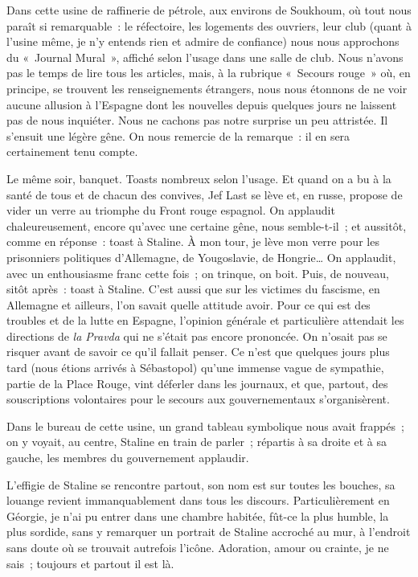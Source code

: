 \documentclass[twoside]{book} %
\newcommand{\astermono}{\medskip\centerline{\color{rubric}\large\selectfont{\syms ✻}}\medskip\par}%
\newcommand\chaptercont{} %
\begin{document}
\chaptercont
\noindent Dans cette usine de raffinerie de pétrole, aux environs de Soukhoum, où tout nous paraît si remarquable : le réfectoire, les logements des ouvriers, leur club (quant à l’usine même, je n’y entends rien et admire de confiance) nous nous approchons du « Journal Mural », affiché selon l’usage dans une salle de club. Nous n’avons pas le temps de lire tous les articles, mais, à la rubrique « Secours rouge » où, en principe, se trouvent les renseignements étrangers, nous nous étonnons de ne voir aucune allusion à l’Espagne dont les nouvelles depuis quelques jours ne laissent pas de nous inquiéter. Nous ne cachons pas notre surprise un peu attristée. Il s’ensuit une légère gêne. On nous remercie de la remarque : il en sera certainement tenu compte.\par
Le même soir, banquet. Toasts nombreux selon l’usage. Et quand on a bu à la santé de tous et de chacun des convives, Jef Last se lève et, en russe, propose de vider un verre au triomphe du Front rouge espagnol. On applaudit chaleureusement, encore qu’avec une certaine gêne, nous semble-t-il ; et aussitôt, comme en réponse : toast à Staline. À mon tour, je lève mon verre pour les prisonniers politiques d’Allemagne, de Yougoslavie, de Hongrie… On applaudit, avec un enthousiasme franc cette fois ; on trinque, on boit. Puis, de nouveau, sitôt après : toast à Staline. C’est aussi que sur les victimes du fascisme, en Allemagne et ailleurs, l’on savait quelle attitude avoir. Pour ce qui est des troubles et de la lutte en Espagne, l’opinion générale et particulière attendait les directions de \emph{la Pravda} qui ne s’était pas encore prononcée. On n’osait pas se risquer avant de savoir ce qu’il fallait penser. Ce n’est que quelques jours plus tard (nous étions arrivés à Sébastopol) qu’une immense vague de sympathie, partie de la Place Rouge, vint déferler dans les journaux, et que, partout, des souscriptions volontaires pour le secours aux gouvernementaux s’organisèrent.\par

\astermono

\noindent Dans le bureau de cette usine, un grand tableau symbolique nous avait frappés ; on y voyait, au centre, Staline en train de parler ; répartis à sa droite et à sa gauche, les membres du gouvernement applaudir.\par

\astermono

\noindent L’effigie de Staline se rencontre partout, son nom est sur toutes les bouches, sa louange revient immanquablement dans tous les discours. Particulièrement en Géorgie, je n’ai pu entrer dans une chambre habitée, fût-ce la plus humble, la plus sordide, sans y remarquer un portrait de Staline accroché au mur, à l’endroit sans doute où se trouvait autrefois l’icône. Adoration, amour ou crainte, je ne sais ; toujours et partout il est là.\par
\end{document}
